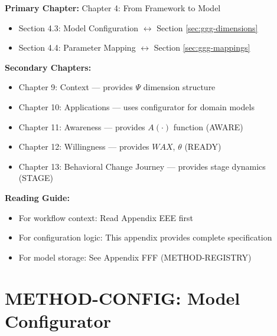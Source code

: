 \begin{tcolorbox}[colback=purple!5!white, colframe=purple!75!black,
    title=Chapter Linkage]

\textbf{Primary Chapter:} Chapter 4: From Framework to Model
\begin{itemize}[nosep]
\item Section 4.3: Model Configuration $\leftrightarrow$ Section \ref{sec:ggg-dimensions}
\item Section 4.4: Parameter Mapping $\leftrightarrow$ Section \ref{sec:ggg-mappings}
\end{itemize}

\textbf{Secondary Chapters:}
\begin{itemize}[nosep]
\item Chapter 9: Context --- provides $\Psi$ dimension structure
\item Chapter 10: Applications --- uses configurator for domain models
\item Chapter 11: Awareness --- provides $A(\cdot)$ function (AWARE)
\item Chapter 12: Willingness --- provides $WAX$, $\theta$ (READY)
\item Chapter 13: Behavioral Change Journey --- provides stage dynamics (STAGE)
\end{itemize}

\textbf{Reading Guide:}
\begin{itemize}[nosep]
\item For workflow context: Read Appendix EEE first
\item For configuration logic: This appendix provides complete specification
\item For model storage: See Appendix FFF (METHOD-REGISTRY)
\end{itemize}

\end{tcolorbox}

\chapter{METHOD-CONFIG: Model Configurator}
\label{app:method-config}

\begin{abstract}
This appendix defines the Model Configurator---a systematic tool for generating
\textbf{9C-complete} behavioral models from four configuration dimensions: Level ($L$),
Geography ($\Psi_{geo}$), Domain, and Scope Type. The Configurator uses seven mapping
tables to auto-populate all 9C parameters: context ($\Psi$), utility dimensions ($C$),
complementarity ($\gamma$), functional form, awareness ($A$), willingness ($WAX$, $\theta$),
and stage dynamics ($\tau$, $\rho$, $\kappa$). This transforms model design from
an expert-dependent art into a structured, reproducible process with complete 9C coverage.
\end{abstract}

